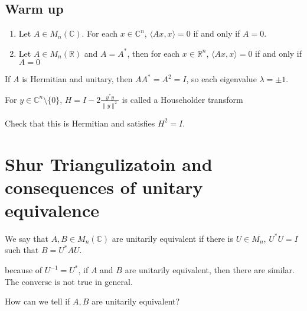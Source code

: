 

\subsection*{Warm up}

\begin{enumerate}[label=(\arabic*)]
  \item Let $A \in M_n(\mathbb{C})$. For each $  x \in \mathbb{C}^n$,
    $ \langle Ax , x \rangle  = 0$ if and only if $A = 0$.
  \item Let $A \in M_n(\mathbb{R})$ and $A = A^*$, then for each $x
    \in \mathbb{R}^n$, $\langle Ax , x \rangle  = 0$ if and only if $A = 0$
\end{enumerate}

\begin{remark}
  If $A$ is Hermitian and unitary, then $AA^* = A^2 = I$, so each
  eigenvalue $ \lambda = \pm 1$.
\end{remark}

\begin{example}
  For $y \in \mathbb{C}^n\setminus \{ 0 \}$, $ H = I - 2
  \frac{y^*y}{\|y\|^2}$ is called a Householder transform
\end{example}
\begin{exercise}
  Check that this is Hermitian and satisfies $H^2 = I$.
\end{exercise}

\section{Shur Triangulizatoin and consequences of unitary equivalence}

\begin{definition}
  We say that $A, B \in M_n(\mathbb{C})$ are unitarily equivalent if
  there is $U \in M_n$, $U^*U = I$ such that $B = U^*AU$.
\end{definition}

\begin{remark}
  because of $U^{-1} = U^*$, if $A$ and $B$ are unitarily equivalent,
  then there are similar. The converse is not true in general.
\end{remark}

\begin{question}
  How can we tell if $A, B$ are unitarily equivalent?
\end{question}

